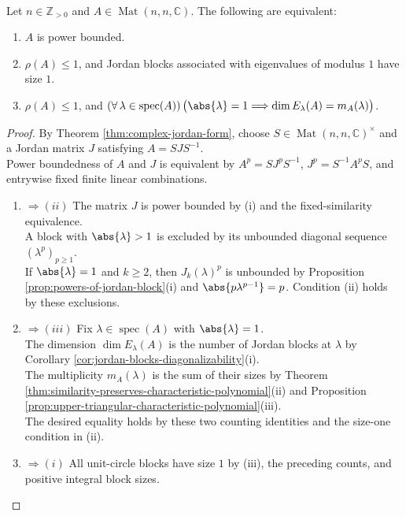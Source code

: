 \begin{theorem} \label{thm:matrix-power-bounded-jordan-criterion} \\
Let $n\in\mathbb{Z}_{>0}$ and $A\in\operatorname{Mat}(n,n,\mathbb{C})$. The following are equivalent:
\begin{enumerate}[label=(\roman*)]
\setlength{\itemsep}{0pt}
\item $A$ is power bounded.
\item $\rho(A)\leq1$, and Jordan blocks associated with eigenvalues of modulus $1$ have size $1$.
\item $\rho(A)\leq1$, and $(\forall\,\lambda\in\operatorname{spec}(A))\,\bigl(\abs{\lambda}=1\Longrightarrow\dim E_{\lambda}(A)=m_A(\lambda)\bigr)$.
\end{enumerate}
\begin{proof}
By Theorem \ref{thm:complex-jordan-form}, choose $S\in\operatorname{Mat}(n,n,\mathbb{C})^\times$ and a Jordan matrix $J$ satisfying $A=SJS^{-1}$.\\
Power boundedness of $A$ and $J$ is equivalent by $A^p=SJ^pS^{-1}$, $J^p=S^{-1}A^pS$, and entrywise fixed finite linear combinations.
\begin{enumerate}[label=(\roman*)]
\setlength{\itemsep}{0pt}
\item[$(i)$]$\Rightarrow (ii)$ The matrix $J$ is power bounded by (i) and the fixed-similarity equivalence.\\
A block with $\abs{\lambda}>1$ is excluded by its unbounded diagonal sequence $(\lambda^p)_{p\geq1}$.\\
If $\abs{\lambda}=1$ and $k\geq2$, then $J_k(\lambda)^p$ is unbounded by Proposition \ref{prop:powers-of-jordan-block}(i) and $\abs{p\lambda^{p-1}}=p$. Condition (ii) holds by these exclusions. \item[$(ii)$]$\Rightarrow (iii)$ Fix $\lambda\in\operatorname{spec}(A)$ with $\abs{\lambda}=1$.\\
The dimension $\dim E_{\lambda}(A)$ is the number of Jordan blocks at $\lambda$ by Corollary \ref{cor:jordan-blocks-diagonalizability}(i).\\
The multiplicity $m_A(\lambda)$ is the sum of their sizes by Theorem \ref{thm:similarity-preserves-characteristic-polynomial}(ii) and Proposition \ref{prop:upper-triangular-characteristic-polynomial}(iii).\\
The desired equality holds by these two counting identities and the size-one condition in (ii). \item[$(iii)$]$\Rightarrow (i)$ All unit-circle blocks have size $1$ by (iii), the preceding counts, and positive integral block sizes.\\

\end{enumerate}
\end{proof}
\end{theorem}
